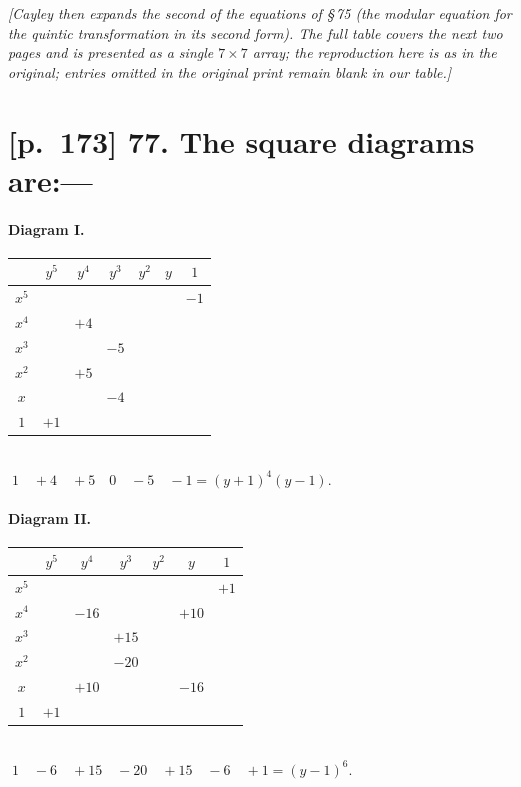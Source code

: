 \documentclass[11pt]{article}
\begin{document}
\noindent\textit{[Cayley then expands the second of the equations of \S\,75 (the modular
equation for the quintic transformation in its second form). The full table
covers the next two pages and is presented as a single $7\times 7$ array; the
reproduction here is as in the original; entries omitted in the original print
remain blank in our table.]}

\section*{[p.~173] \textbf{77.} The square diagrams are:---}

\paragraph{Diagram I.}
\begin{center}
\renewcommand{\arraystretch}{1.05}
\begin{tabular}{|c|c|c|c|c|c|c|}
\hline
       & $y^5$ & $y^4$ & $y^3$ & $y^2$ & $y$ & $1$ \\
\hline
$x^5$ &       &       &       &       &      & $-1$ \\
\hline
$x^4$ &       & $+4$ &       &       &      &      \\
\hline
$x^3$ &       &       & $-5$ &       &      &      \\
\hline
$x^2$ &       & $+5$ &       &       &      &      \\
\hline
$x$   &       &       & $-4$ &       &      &      \\
\hline
$1$   & $+1$ &       &       &       &      &      \\
\hline
\end{tabular}\\[2pt]
\(\;1\quad+4\quad+5\quad 0\quad-5\quad-1=(y+1)^4(y-1).\)
\end{center}

\paragraph{Diagram II.}
\begin{center}
\renewcommand{\arraystretch}{1.05}
\begin{tabular}{|c|c|c|c|c|c|c|}
\hline
       & $y^5$ & $y^4$ & $y^3$ & $y^2$ & $y$ & $1$ \\
\hline
$x^5$ &       &       &       &       &      & $+1$ \\
\hline
$x^4$ &       & $-16$ &      &       & $+10$ &      \\
\hline
$x^3$ &       &       & $+15$ &      &      &      \\
\hline
$x^2$ &       &       & $-20$ &      &      &      \\
\hline
$x$   &       & $+10$ &      &       & $-16$ &      \\
\hline
$1$   & $+1$ &       &       &       &      &      \\
\hline
\end{tabular}\\[2pt]
\(\;1\quad-6\quad+15\quad-20\quad+15\quad-6\quad+1=(y-1)^6.\)
\end{center}
\end{document}
